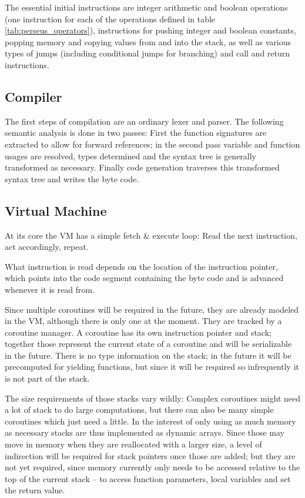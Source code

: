 			The essential initial instructions are integer arithmetic and boolean operations (one instruction for each of the operations defined in table \ref{tab:perseus_operators}), instructions for pushing integer and boolean constants, popping memory and copying values from and into the stack, as well as various types of jumps (including conditional jumps for branching) and call and return instructions.
		
		\subsection{Compiler}
			
			The first steps of compilation are an ordinary lexer and parser. The following semantic analysis is done in two passes: First the function signatures are extracted to allow for forward references; in the second pass variable and function usages are resolved, types determined and the syntax tree is generally transformed as necessary. Finally code generation traverses this transformed syntax tree and writes the byte code.
			
		\subsection{Virtual Machine}
			
			At its core the VM has a simple fetch \& execute loop: Read the next instruction, act accordingly, repeat.
			
			What instruction is read depends on the location of the instruction pointer, which points into the code segment containing the byte code and is advanced whenever it is read from.
			
			Since multiple coroutines will be required in the future, they are already modeled in the VM, although there is only one at the moment. They are tracked by a coroutine manager. A coroutine has its own instruction pointer and stack; together those represent the current state of a coroutine and will be serializable in the future. There is no type information on the stack; in the future it will be precomputed for yielding functions, but since it will be required so infrequently it is not part of the stack.
			
			The size requirements of those stacks vary wildly: Complex coroutines might need a lot of stack to do large computations, but there can also be many simple coroutines which just need a little. In the interest of only using as much memory as necessary stacks are thus implemented as dynamic arrays. Since those may move in memory when they are reallocated with a larger size, a level of indirection will be required for stack pointers once those are added; but they are not yet required, since memory currently only needs to be accessed relative to the top of the current stack -- to access function parameters, local variables and set the return value.
			
